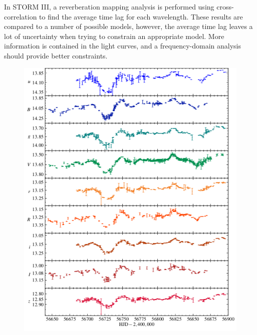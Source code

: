 \documentclass[11pt,letterpaper]{article}
\begin{document}
In STORM III, a reverberation mapping analysis is performed using cross-correlation to find the average time lag for each wavelength. These results are compared to a number of possible models, however, the average time lag leaves a lot of uncertainty when trying to constrain an appropriate model. More information is contained in the light curves, and a frequency-domain analysis should provide better constraints.

\begin{figure}
    \centering
    \begin{minipage}{.475\textwidth}
        \centering
        \includegraphics[width=1\linewidth]{../img/lightcurves.pdf}
        \label{fig:lightcurves}
    \end{minipage}
    \hfill
    \begin{minipage}{.475\textwidth}
        \centering

\end{minipage}
\end{figure}
\end{document}
